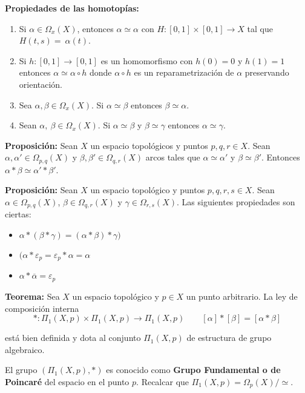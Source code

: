 \documentclass{article}
\begin{document}
\textbf{Propiedades de las homotopías:}
\begin{enumerate}
\item Si $\alpha\in \Omega_x(X)$, entonces $\alpha\simeq \alpha$ con $H:[0,1]\times [0,1]\rightarrow X$ tal que $H(t,s)=~\alpha(t)$.

\item Si $h:[0,1]\rightarrow [0,1]$ es un homomorfismo con $h(0)=0$ y $h(1)=1$ entonces $\alpha\simeq \alpha\circ h$ donde $\alpha \circ h$ es un reparametrización de $\alpha$ preservando orientación.

\item Sea $\alpha,\beta \in \Omega_x(X)$. Si $\alpha\simeq \beta$ entonces $\beta \simeq \alpha$.

\item Sean $\alpha,\:\beta\in \Omega_x(X)$. Si $\alpha\simeq \beta$ y $\beta\simeq \gamma$ entonces $\alpha\simeq \gamma$.
\end{enumerate}

\textbf{Proposición:} Sean $X$ un espacio topológicos y puntos $p,q,r\in X$. Sean $\alpha,\alpha'\in \Omega_{p,q}(X)$ y $\beta,\beta'\in \Omega_{q,r}(X)$ arcos tales que $\alpha\simeq \alpha'$ y $\beta\simeq \beta'$. Entonces $\alpha*\beta\simeq \alpha'*\beta'$.

\textbf{Proposición:} Sean $X$ un espacio topológico y puntos $p,q,r,s\in X$. Sean $\alpha \in \Omega_{p,q}(X)$, $\beta\in \Omega_{q,r}(X)$ y $\gamma\in \Omega_{r,s}(X)$. Las siguientes propiedades son ciertas:

\begin{itemize}
\item $\alpha*(\beta*\gamma)=(\alpha*\beta)*\gamma)$

\item $(\alpha*\varepsilon_p=\varepsilon_p*\alpha=\alpha$

\item $	\alpha*\overline{\alpha} = \varepsilon_p$
\end{itemize}

\textbf{Teorema:} Sea $X$ un espacio topológico y $p\in X$ un punto arbitrario. La ley de composición interna
\begin{equation*}
*:\Pi_1(X,p)\times\Pi_1(X,p)\rightarrow\Pi_1(X,p)\qquad [\alpha]*[\beta]=[\alpha*\beta]
\end{equation*}

está bien definida y dota al conjunto $\Pi_1(X,p)$ de estructura de grupo algebraico.

El grupo $(\Pi_1(X,p),*)$ es conocido como \textbf{Grupo Fundamental o de Poincaré} del espacio en el punto $p$. Recalcar que $\Pi_1(X,p)=\Omega_p(X)/\simeq$.\\
\end{document}
